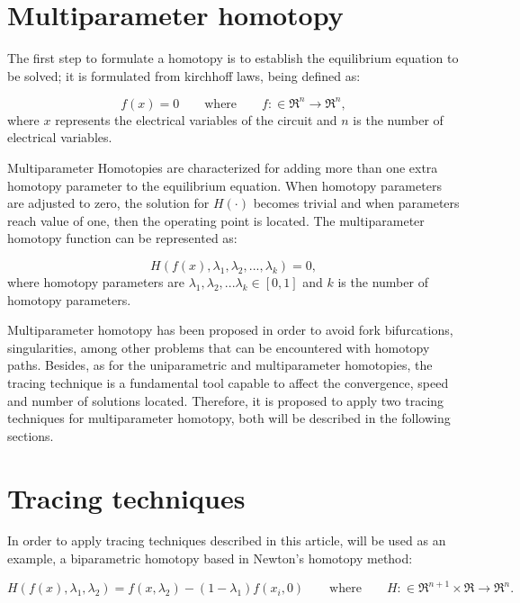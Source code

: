 \documentclass[conference,letterpaper,onecolumn]{IEEEtran}
\begin{document}
\section{Multiparameter homotopy}
The first step to formulate a homotopy is to establish the equilibrium equation to be solved; it is formulated from kirchhoff laws, being defined as:

\begin{equation}
{f}({x})={0} \qquad \text{where} \qquad f:\in \mathfrak{R}^n \to  \mathfrak{R}^n, 
\label{fx}
\end{equation}
where $x$ represents the electrical variables of the circuit and $n$ is the number of electrical variables.

Multiparameter Homotopies \cite{homo_DWolfMulti,BLHOM2,homo_dobletrazado} are characterized for adding more than one extra homotopy parameter to the equilibrium equation. When homotopy parameters are adjusted to zero, the solution for $H(\cdot)$ becomes trivial and when parameters reach value of one, then the operating point is located. The multiparameter homotopy function can be represented as:

\begin{equation}
{H}({f}({x}),\lambda_1,\lambda_2,...,\lambda_k)=0, 
\end{equation}
where homotopy parameters are $\lambda_1,\lambda_2,...\lambda_k\in[0,1]$ and $k$ is the number of homotopy parameters.

Multiparameter homotopy \cite{homo_DWolfMulti} has been proposed in order to avoid fork bifurcations, singularities, among other problems that can be encountered with homotopy paths. Besides, as for the uniparametric \cite{homo_ArtificialP} and multiparameter homotopies, the tracing technique \cite{homo_hk,homo_allgower} is a fundamental tool capable to affect the convergence, speed and number of solutions located. Therefore, it is proposed to apply two tracing techniques for multiparameter homotopy, both will be described in the following sections.

\section{Tracing techniques}
In order to apply tracing techniques described in this article, will be used as an example, a biparametric homotopy based in Newton's homotopy method:


\begin{equation}
{H}({f}({x}),\lambda_1,\lambda_2 ) =f(x,\lambda_2)-(1-\lambda_1 )f(x_i,0) \qquad \text{where} \qquad H:\in \mathfrak{R}^{n+1} \times \mathfrak{R} \to  \mathfrak{R}^n. 
\label{hexamp1l}
\end{equation}
\end{document}
